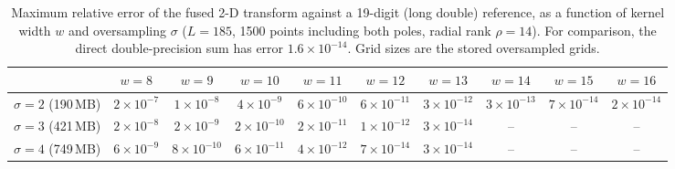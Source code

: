 \begin{table}[!htbp]\centering\footnotesize\setlength{\tabcolsep}{3pt}
\caption{Maximum relative error of the fused 2-D transform against a 19-digit (long double) reference, as a function of
kernel width $w$ and oversampling $\sigma$ ($L=185$, 1500 points including both poles, radial rank $\rho=14$).
For comparison, the direct double-precision sum has error $1.6\times10^{-14}$. Grid sizes are the stored oversampled grids.}\label{tab:wscan}
\begin{tabular}{lccccccccc}\toprule
&$w=8$ & $w=9$ & $w=10$ & $w=11$ & $w=12$ & $w=13$ & $w=14$ & $w=15$ & $w=16$\\\midrule
$\sigma=2$ (190\,MB) & $2\times10^{-7}$ & $1\times10^{-8}$ & $4\times10^{-9}$ & $6\times10^{-10}$ & $6\times10^{-11}$ & $3\times10^{-12}$ & $3\times10^{-13}$ & $7\times10^{-14}$ & $2\times10^{-14}$\\
$\sigma=3$ (421\,MB) & $2\times10^{-8}$ & $2\times10^{-9}$ & $2\times10^{-10}$ & $2\times10^{-11}$ & $1\times10^{-12}$ & $3\times10^{-14}$ & -- & -- & --\\
$\sigma=4$ (749\,MB) & $6\times10^{-9}$ & $8\times10^{-10}$ & $6\times10^{-11}$ & $4\times10^{-12}$ & $7\times10^{-14}$ & $3\times10^{-14}$ & -- & -- & --\\
\bottomrule\end{tabular}\end{table}
